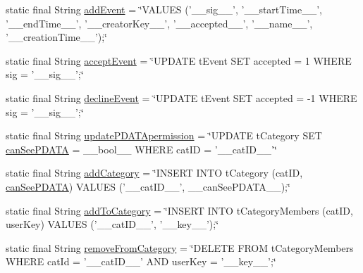 \begin{DoxyCompactItemize}
\item 
static final String \hyperlink{classballmerpeak_1_1turtlenet_1_1server_1_1DBStrings_a179f2c1d92f556d4fa74acf16cf13f7a}{add\-Event} = \char`\"{}V\-A\-L\-U\-E\-S ('\-\_\-\-\_\-sig\-\_\-\-\_\-', '\-\_\-\-\_\-start\-Time\-\_\-\-\_\-', '\-\_\-\-\_\-end\-Time\-\_\-\-\_\-', '\-\_\-\-\_\-creator\-Key\-\_\-\-\_\-', '\-\_\-\-\_\-accepted\-\_\-\-\_\-', '\-\_\-\-\_\-name\-\_\-\-\_\-', '\-\_\-\-\_\-creation\-Time\-\_\-\-\_\-');\char`\"{}
\item 
static final String \hyperlink{classballmerpeak_1_1turtlenet_1_1server_1_1DBStrings_acf9b2fff82aaa6ad4d024ff69d1cba96}{accept\-Event} = \char`\"{}U\-P\-D\-A\-T\-E t\-Event S\-E\-T accepted = 1 W\-H\-E\-R\-E sig = '\-\_\-\-\_\-sig\-\_\-\-\_\-';\char`\"{}
\item 
static final String \hyperlink{classballmerpeak_1_1turtlenet_1_1server_1_1DBStrings_a17aab2fc0a6a4f06d268a67e4e7104d4}{decline\-Event} = \char`\"{}U\-P\-D\-A\-T\-E t\-Event S\-E\-T accepted = -\/1 W\-H\-E\-R\-E sig = '\-\_\-\-\_\-sig\-\_\-\-\_\-';\char`\"{}
\item 
static final String \hyperlink{classballmerpeak_1_1turtlenet_1_1server_1_1DBStrings_a1464c2aac4cc5e8112ece2e1840e1976}{update\-P\-D\-A\-T\-Apermission} = \char`\"{}U\-P\-D\-A\-T\-E t\-Category S\-E\-T \hyperlink{classballmerpeak_1_1turtlenet_1_1server_1_1DBStrings_a77d2491681df92cdf133252afe8af98d}{can\-See\-P\-D\-A\-T\-A} = \-\_\-\-\_\-bool\-\_\-\-\_\- W\-H\-E\-R\-E cat\-I\-D = '\-\_\-\-\_\-cat\-I\-D\-\_\-\-\_\-'\char`\"{}
\item 
static final String \hyperlink{classballmerpeak_1_1turtlenet_1_1server_1_1DBStrings_a4de95aa5509b7246d85f48577ea3822e}{add\-Category} = \char`\"{}I\-N\-S\-E\-R\-T I\-N\-T\-O t\-Category (cat\-I\-D, \hyperlink{classballmerpeak_1_1turtlenet_1_1server_1_1DBStrings_a77d2491681df92cdf133252afe8af98d}{can\-See\-P\-D\-A\-T\-A}) V\-A\-L\-U\-E\-S ('\-\_\-\-\_\-cat\-I\-D\-\_\-\-\_\-', \-\_\-\-\_\-can\-See\-P\-D\-A\-T\-A\-\_\-\-\_\-);\char`\"{}
\item 
static final String \hyperlink{classballmerpeak_1_1turtlenet_1_1server_1_1DBStrings_ae9cfc6daa2238b984d82b11442b47a49}{add\-To\-Category} = \char`\"{}I\-N\-S\-E\-R\-T I\-N\-T\-O t\-Category\-Members (cat\-I\-D, user\-Key) V\-A\-L\-U\-E\-S ('\-\_\-\-\_\-cat\-I\-D\-\_\-\-\_\-', '\-\_\-\-\_\-key\-\_\-\-\_\-');\char`\"{}
\item 
static final String \hyperlink{classballmerpeak_1_1turtlenet_1_1server_1_1DBStrings_a46667f523f0f1dad5378e5b23b49a18e}{remove\-From\-Category} = \char`\"{}D\-E\-L\-E\-T\-E F\-R\-O\-M t\-Category\-Members W\-H\-E\-R\-E cat\-Id = '\-\_\-\-\_\-cat\-I\-D\-\_\-\-\_\-' A\-N\-D user\-Key = '\-\_\-\-\_\-key\-\_\-\-\_\-';\char`\"{}

\end{DoxyCompactItemize}

